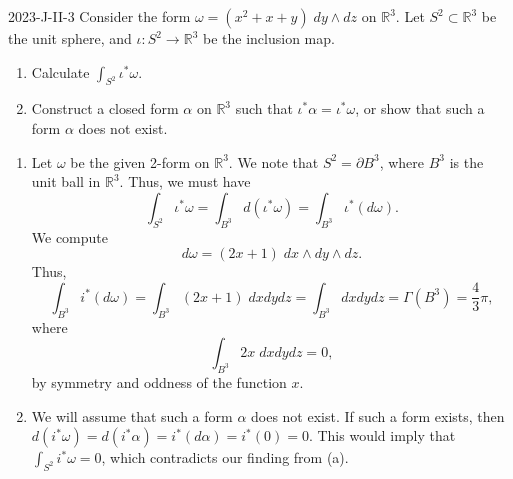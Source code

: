 \documentclass{article}
\begin{document}
	\begin{prb}{2023-J-II-3}
		Consider the form $\omega = (x^{2} + x + y)\;dy \wedge dz$ on $\mathbb{R}^{3}$. Let $S^{2} \subset \mathbb{R}^{3}$ be the unit sphere, and $\iota: S^{2} \to \mathbb{R}^{3}$ be the inclusion map. \vspace{-0.25cm}
		\begin{enumerate}[itemsep =-2pt,label = (\alph{*})]
			\item Calculate $\int_{S^{2}}\iota^{\ast}\omega$. 
			\item Construct a closed form $\alpha$ on $\mathbb{R}^{3}$ such that $\iota^{\ast}\alpha = \iota^{\ast}\omega$, or show that such a form $\alpha$ does not exist. 
		\end{enumerate}
	\end{prb}
	\begin{enumerate}[itemsep =-2pt,label = (\alph{*})]
		\item Let $\omega$ be the given 2-form on $\mathbb{R}^{3}$. We note that $S^{2} = \partial B^{3}$, where $B^{3}$ is the unit ball in $\mathbb{R}^{3}$. Thus, we must have 
		\begin{equation*}
			\int_{S^{2}}\iota^{\ast}\omega = \int_{B^{3}}d(\iota^{\ast}\omega) = \int_{B^{3}}\iota^{\ast}(d\omega). 
		\end{equation*}
		We compute 
		\begin{equation*}
			d\omega = (2x + 1)\;dx \wedge dy \wedge dz. 
		\end{equation*}
		Thus, 
		\begin{equation*}
			\int_{B^{3}}i^{\ast}(d\omega) = \int_{B^{3}}(2x + 1)\;dxdydz = \int_{B^{3}}dxdydz = \Gamma(B^{3}) = \frac{4}{3}\pi, 
		\end{equation*}
		where 
		\begin{equation*}
			\int_{B^{3}}2x\;dxdydz =0, 
		\end{equation*}
		by symmetry and oddness of the function $x$. 
		\item We will assume that such a form $\alpha$ does not exist. If such a form exists, then $d(i^{\ast}\omega) = d(i^{\ast}\alpha) = i^{\ast}(d\alpha) = i^{\ast}(0) = 0$. This would imply that $\int_{S^{2}}i^{\ast}\omega = 0$, which contradicts our finding from (a). 
	\end{enumerate}
	
\end{document}
